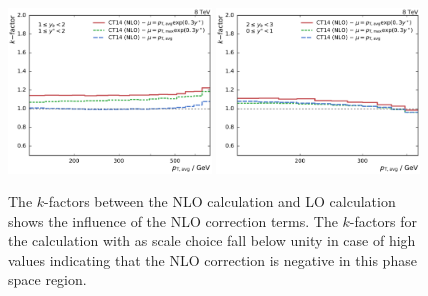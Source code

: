 \begin{figure}[htp]
    \includegraphics[width=0.48\textwidth]{figures/theory/kfactor_comp_yb1ys1.pdf}\hfill
    \includegraphics[width=0.48\textwidth]{figures/theory/kfactor_comp_yb2ys0.pdf}
    \caption[NLO $k$-factors of \NLOJETPP calculation]{The $k$-factors between the NLO calculation and LO calculation
        shows the influence of the NLO correction terms. The $k$-factors for the
        calculation with \ptavg as scale choice fall below unity in case of high
        \ystar values indicating that the NLO correction is negative in this
        phase space region.}
    \label{fig:kfactor_comp}
\end{figure}

%
%

